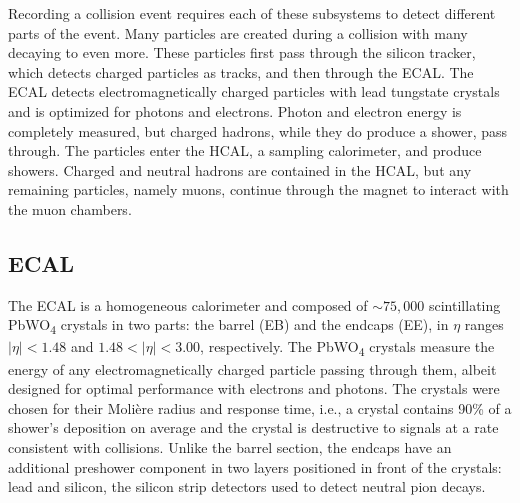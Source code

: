 \documentclass[12pt]{article}
\begin{document}
Recording a collision event requires each of these subsystems to detect different parts of the event. Many particles are created during a collision with many decaying to even more. These particles first pass through the silicon tracker, which detects charged particles as tracks, and then through the ECAL. The ECAL detects electromagnetically charged particles with lead tungstate crystals and is optimized for photons and electrons. Photon and electron energy is completely measured, but charged hadrons, while they do produce a shower, pass through. The particles enter the HCAL, a sampling calorimeter, and produce showers. Charged and neutral hadrons are contained in the HCAL, but any remaining particles, namely muons, continue through the magnet to interact with the muon chambers.\par

\subsection{ECAL}

The ECAL is a homogeneous calorimeter and composed of  ${\sim} 75,000$ scintillating PbWO\textsubscript{4} crystals in two parts: the barrel (EB) and the endcaps (EE), in $\eta$ ranges $|\eta| < 1.48$ and $1.48 < |\eta| < 3.00$, respectively. The PbWO\textsubscript{4} crystals measure the energy of any electromagnetically charged particle passing through them, albeit designed for optimal performance with electrons and photons. The crystals were chosen for their Moli\`ere radius and response time, i.e., a crystal contains 90\% of a shower's deposition on average and the crystal is destructive to signals at a rate consistent with collisions. Unlike the barrel section, the endcaps have an additional preshower component in two layers positioned in front of the crystals: lead and silicon, the silicon strip detectors used to detect neutral pion decays.\par
\end{document}

